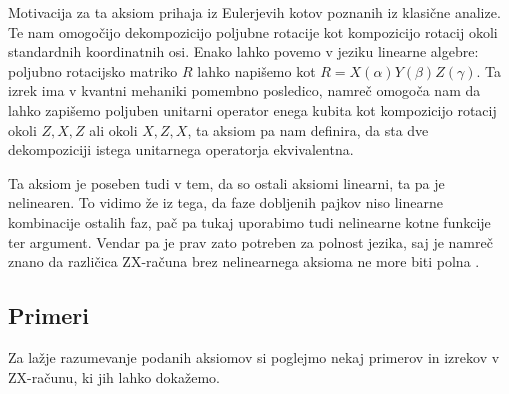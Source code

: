 \documentclass[mat1]{fmfdelo}
\begin{document}
Motivacija za ta aksiom prihaja iz Eulerjevih kotov poznanih iz klasične analize. Te nam omogočijo dekompozicijo poljubne rotacije kot kompozicijo rotacij okoli standardnih koordinatnih osi. Enako lahko povemo v jeziku linearne algebre: poljubno rotacijsko matriko \(R\) lahko napišemo kot \(R=X(\alpha)Y(\beta)Z(\gamma)\). Ta izrek ima v kvantni mehaniki pomembno posledico, namreč omogoča nam da lahko zapišemo poljuben unitarni operator enega kubita kot kompozicijo rotacij okoli \(Z,X,Z\) ali okoli \(X,Z,X\), ta aksiom pa nam definira, da sta dve dekompoziciji istega unitarnega operatorja ekvivalentna.

Ta aksiom je poseben tudi v tem, da so ostali aksiomi linearni, ta pa je nelinearen. To vidimo že iz tega, da faze dobljenih pajkov niso linearne kombinacije ostalih faz, pač pa tukaj uporabimo tudi nelinearne kotne funkcije ter argument. Vendar pa je prav zato potreben za polnost jezika, saj je namreč znano da različica ZX-računa brez nelinearnega aksioma ne more biti polna \cite[izrek 6.1]{jeandeldiagrammatic}.

\subsection{Primeri}
Za lažje razumevanje podanih aksiomov si poglejmo nekaj primerov in izrekov v ZX-računu, ki jih lahko dokažemo.
\end{document}
